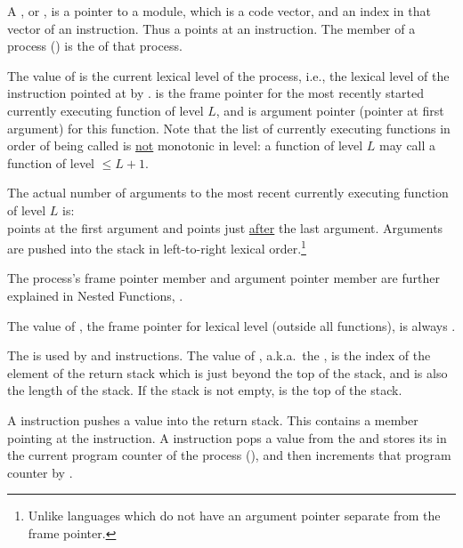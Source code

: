 \documentclass[12pt]{article}
\begin{document}
A , or , is a pointer to a module,
which is a code vector, and an index in that vector of an instruction.
Thus a  points at an instruction.  The  member of a
process () is the  of that process.

The value of  is the current lexical level of the
process, i.e., the lexical level of the instruction pointed at
by .   is the frame pointer for the
most recently started currently executing function of level $L$,
and  is argument pointer (pointer at first argument)
for this function.
Note that the list of currently executing functions
in order of being called is \underline{not} monotonic in level: a function
of level $L$ may call a function of level $\leq L+1$.

The actual number of arguments to the most recent
currently executing function of
level $L$ is:
\hspace*{1in} \\
 points at the first argument and
 points just \underline{after} the last argument.
Arguments are pushed into the stack in left-to-right lexical
order.\footnote{Unlike languages which do not have an argument
pointer separate from the frame pointer.}

The process's frame pointer member 
and argument pointer member 
are further explained in Nested Functions,
.

The value of , the frame pointer
for lexical level  (outside all functions), is always .

The  is used by  and 
instructions.  The value of ,
a.k.a.~the , is the index of the element of
the return stack which is just beyond the top of the stack,
and is also the length of the stack.  If the stack is not empty,
 is the top of the stack.

A  instruction pushes a  value
into the return stack.  This contains a  member
pointing at the  instruction.
A  instruction pops a  value from
the  and stores its 
in the current program counter
of the process (), and then increments that program counter
by .
\end{document}
